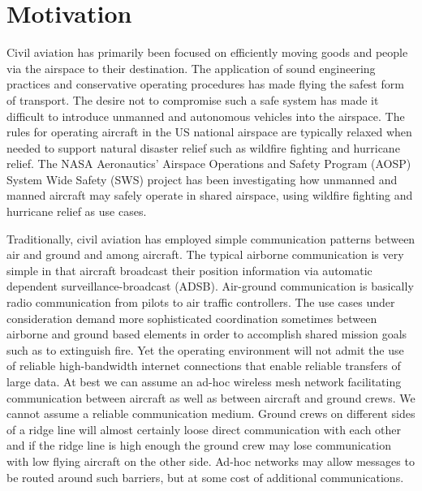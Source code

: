 \section{Motivation}

Civil aviation has primarily been focused on efficiently moving goods
and people via the airspace to their destination. The application of
sound engineering practices and conservative operating procedures has
made flying the safest form of transport. The desire not to compromise
such a safe system has made it difficult to introduce unmanned and
autonomous vehicles into the airspace. The rules for operating
aircraft in the US national airspace are typically relaxed when needed
to support natural disaster relief such as wildfire fighting and
hurricane relief. The NASA Aeronautics' Airspace Operations and Safety
Program (AOSP) System Wide Safety (SWS) project has been investigating
how unmanned and manned aircraft may safely operate in shared
airspace, using wildfire fighting and hurricane relief as use cases.

Traditionally, civil aviation has employed simple communication
patterns between air and ground and among aircraft. The typical
airborne communication is very simple in that aircraft broadcast their
position information via automatic dependent surveillance-broadcast
(ADSB). Air-ground communication is basically radio communication from
pilots to air traffic controllers.  The use cases under consideration
demand more sophisticated coordination sometimes between airborne and
ground based elements in order to accomplish shared mission goals such
as to extinguish fire. Yet the operating environment will not admit
the use of reliable high-bandwidth internet connections that enable
reliable transfers of large data. At best we can assume an ad-hoc
wireless mesh network facilitating communication between aircraft as
well as between aircraft and ground crews. We cannot assume a reliable
communication medium. Ground crews on different sides of a ridge line
will almost certainly loose direct communication with each other and
if the ridge line is high enough the ground crew may lose
communication with low flying aircraft on the other side. Ad-hoc
networks may allow messages to be routed around such barriers, but at
some cost of additional communications.
